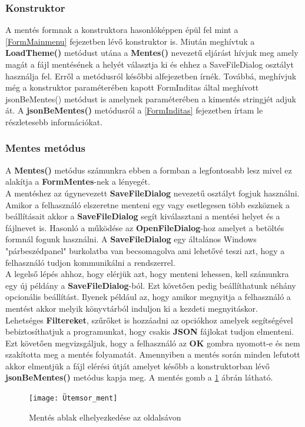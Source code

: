 \documentclass[tocnopagenum]{thesis-ekf}
\theoremstyle{definition}
\theoremstyle{remark}
\begin{document}
	\subsubsection{Konstruktor}
	A mentés formnak a konstruktora hasonlóképpen épül fel mint a \ref{FormMainmenu} fejezetben lévő konstruktor is. 
	Miután meghívtuk a \textbf{LoadTheme()} metódust utána a \textbf{Mentes()} nevezetű eljárást hívjuk meg amely magát a fájl mentésének a helyét választja ki és ehhez a SaveFileDialog osztályt használja fel. Erről a metódusról későbbi alfejezetben írnék.
	Továbbá, meghívjuk még a konstruktor paraméterében kapott FormInditas által meghívott jsonBeMentes() metódust is amelynek paraméterében a kimentés stringjét adjuk át. A \textbf{jsonBeMentes()} metódusról a \ref{FormInditas} fejezetben írtam le részletesebb információkat.
	\subsubsection{Mentes metódus}
	A \textbf{Mentes()} metódus számunkra ebben a formban a legfontosabb lesz mivel ez alakítja a \textbf{FormMentes}-nek a lényegét. 
	\\
	A mentéshez az úgynevezett \textbf{SaveFileDialog} nevezetű osztályt fogjuk használni. 
	\\
	Amikor a felhasználó elszeretne menteni egy vagy esetlegesen több eszköznek a beállításait akkor a \textbf{SaveFileDialog} segít kiválasztani a mentési helyet és a fájlnevet is. Hasonló a működése az \textbf{OpenFileDialog}-hoz amelyet a betöltés formnál fogunk használni. A \textbf{SaveFileDialog} egy általános Windows "párbeszédpanel" burkolatba van becsomagolva ami lehetővé teszi azt, hogy a felhasználó tudjon kommunikálni a rendszerrel.
	\\
	A legelső lépés ahhoz, hogy elérjük azt, hogy menteni lehessen, kell számunkra egy új példány a \textbf{SaveFileDialog}-ból. Ezt követően pedig beállíthatunk néhány opcionális beállítást. Ilyenek például az, hogy amikor megnyitja a felhasználó a mentést akkor melyik könyvtárból induljon ki a kezdeti megnyitáskor. 
	\\
	Lehetséges \textbf{Filtereket}, szűrőket is hozzáadni az opciókhoz amelyek segítségével bebiztosíthatjuk a programunkat, hogy csakis \textbf{JSON} fájlokat tudjon elmenteni.
	\\
	Ezt követően megvizsgáljuk, hogy a felhasználó az \textbf{OK} gombra nyomott-e és nem szakította meg a mentés folyamatát. Amennyiben a mentés során minden lefutott akkor elmentjük a fájl elérési útját amelyet később a konstruktorban lévő \textbf{jsonBeMentes()} metódus kapja meg.
	A mentés gomb a \ref{fig:mentesgomb} ábrán látható.
	\begin{figure}[H]	
		\centering
		\texttt{[image: Ütemsor\_ment]}
		\caption[Mentés ablak elhelyezkedése az oldalsávon]{Mentés ablak elhelyezkedése az oldalsávon}
		\label{fig:mentesgomb}
	\end{figure}
\end{document}
